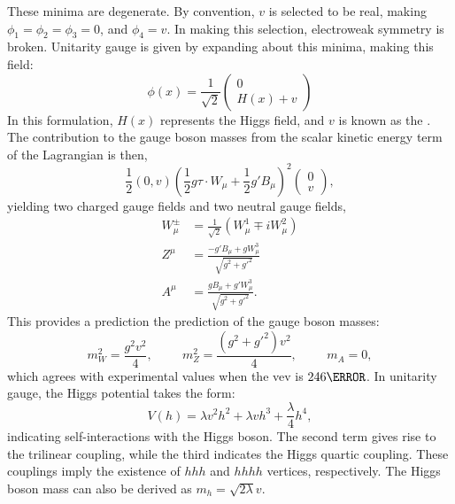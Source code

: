 These minima are degenerate. By convention, $v$ is selected to be real, making $\phi_1 = \phi_2 = \phi_3 = 0$, and $\phi_4 = v$.  In making this selection, electroweak symmetry is broken. Unitarity gauge is given by expanding about this minima, making this field:
\begin{equation}
    \phi(x) = \frac{1}{\sqrt{2}} \begin{pmatrix} 0\\ H(x)+v \end{pmatrix}
\end{equation}
%
In this formulation, $H(x)$ represents the Higgs field, and $v$ is known as the . The contribution to the gauge boson masses from the scalar kinetic energy term of the Lagrangian is then,
\begin{equation}
\frac{1}{2}(0,v)(\frac{1}{2}g\tau \cdot W_{\mu} + \frac{1}{2}g'B_{\mu})^2 \begin{pmatrix}0\\v \end{pmatrix},
\end{equation}
yielding two charged gauge fields and two neutral gauge fields,
\begin{align}
    W^{\pm}_{\mu} &= \frac{1}{\sqrt{2}} ( W_{\mu}^1 \mp i W_{\mu}^2)\\
    Z^{\mu} &= \frac{-g'B_{\mu} + g W_{\mu}^{3}}{\sqrt{g^2 + g'^{2}}}\\
    A^{\mu} &= \frac{gB_{\mu} + g' W_{\mu}^{3}}{\sqrt{g^2 + g'^{2}}}.
\end{align}
This provides a prediction the prediction of the gauge boson masses:
%
\begin{equation}
    m^2_W = \frac{g^2 v^2}{4}, \hspace{1cm} m^2_Z = \frac{(g^2 +g'^2)v^2}{4}, \hspace{1cm} m_{A} =0,
\end{equation}
%
which agrees with experimental values when the \gls{vev} is $\unit{246}{\GeV}$. In unitarity gauge, the Higgs potential takes the form:
\begin{equation}
    V(h) = \lambda v^2 h^2 + \lambda v h^3 + \frac{\lambda}{4}h^4,
\end{equation}
%
indicating self-interactions with the Higgs boson. The second term gives rise to the trilinear coupling, while the third indicates the Higgs quartic coupling. These couplings imply the existence of $hhh$ and $hhhh$ vertices, respectively. The Higgs boson mass can also be derived as $m_h = \sqrt{2\lambda}v$. 


